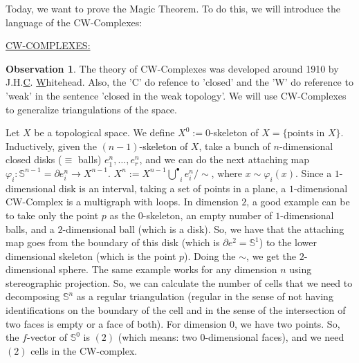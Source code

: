\documentclass[12pt,a4paper,oneside]{article}
\numberwithin{equation}{section}
\theoremstyle{definition}
\newtheorem{obs}{Observation}
\begin{document}
\date{\today}

Today, we want to prove the Magic Theorem. To do this, we will introduce the language of the CW-Complexes: \newline

\underline{CW-COMPLEXES:}
\begin{obs} The theory of CW-Complexes was developed around 1910 by J.H.\underline{C}. \underline{W}hitehead. Also, the 'C' do refence to 'closed' and the 'W' do reference to 'weak' in the sentence 'closed in the weak topology'. \newline
We will use CW-Complexes to generalize triangulations of the space.
\end{obs}

Let $X$ be a topological space. \newline
We define $X^{0} := 0$-skeleton of $X = \lbrace \text{points in } X \rbrace$. \newline
Inductively, given the $(n-1)$-skeleton of $X$, take a bunch of $n$-dimensional closed disks ($\equiv$ balls) $e_{1}^{n}, \ldots, e_{r}^{n}$, and we can do the next attaching map $\varphi _{i} : \mathbb{S}^{n - 1} = \partial e_{i}^{n} \longrightarrow X^{n - 1}$. \newline
$X^{n} := X^{n-1} \stackrel{\bullet}{\bigcup}_{i} e_{i}^{n} / \sim$, where $x \sim \varphi_{i}(x)$. \newline
Since a $1$-dimensional disk is an interval, taking a set of points in a plane, a $1$-dimensional CW-Complex is a multigraph with loops. \newline
In dimension $2$, a good example can be to take only the point $p$ as the $0$-skeleton, an empty number of $1$-dimensional balls, and a $2$-dimensional ball (which is a disk). So, we have that the attaching map goes from the boundary of this disk (which is $\partial e^{2} = \mathbb{S}^{1}$) to the lower dimensional skeleton (which is the point $p$). Doing the $\sim$, we get the $2$-dimensional sphere. \newline
The same example works for any dimension $n$ using stereographic projection. So, we can calculate the number of cells that we need to decomposing $\mathbb{S}^{n}$ as a regular triangulation (regular in the sense of not having identifications on the boundary of the cell and in the sense of the intersection of two faces is empty or a face of both). \newline
For dimension $0$, we have two points. So, the $f$-vector of $\mathbb{S}^{0}$ is $(2)$ (which means: two $0$-dimensional faces), and we need $(2)$ cells in the CW-complex. \newline
\end{document}
